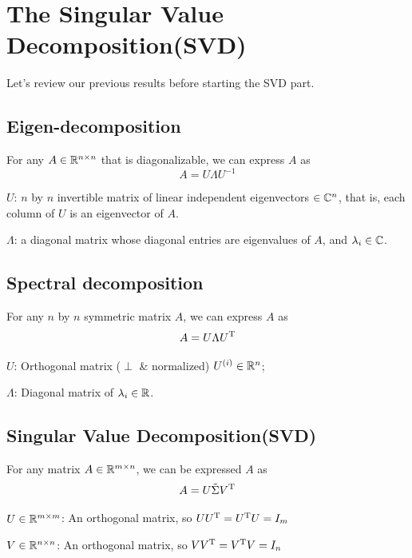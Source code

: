 \section{The Singular Value Decomposition(SVD)}

Let's review our previous results before starting the SVD part.

\subsection{Eigen-decomposition}

For any $A\in \mathbb{R}^{n\times n}$ that is diagonalizable,  we can express $A$ as 
\begin{equation*}
A = U\Lambda U^{-1}
\end{equation*}

$U$: $n$ by $n$ invertible matrix of linear independent eigenvectors $\in \mathbb{C}^n$, that is, each column of $U$ is an eigenvector of $A$.

$\Lambda$: a diagonal matrix whose diagonal entries are eigenvalues of $A$, and $\lambda_i\in \mathbb{C}$.


\subsection{Spectral decomposition}

For any $n$ by $n$ symmetric matrix $A$, we can express $A$ as
\begin{equation*}
A = U\Lambda U^{{\rm T}}
\end{equation*}

$U$: Orthogonal matrix ($\perp$ \& normalized) $U^{(i)}\in \mathbb{R}^n$;

$\Lambda$: Diagonal matrix of $\lambda_i \in \mathbb{R}$.



\subsection{Singular Value Decomposition(SVD)}

For any matrix $A\in \mathbb{R}^{m\times n}$, we can be expressed $A$ as 
\begin{equation*}
A =U\tilde{\Sigma} V^{{\rm T}}
\end{equation*}

$U\in \mathbb{R}^{m\times m}$: An orthogonal matrix, so $UU^{{\rm T}} =U^{{\rm T}}U = I_m$

$V\in \mathbb{R}^{n\times n}$: An orthogonal matrix, so $VV^{{\rm T}} = V^{{\rm T}}V =I_n$

